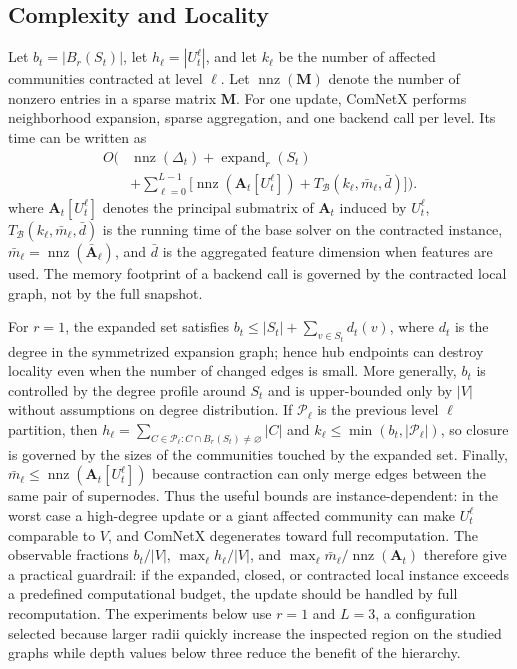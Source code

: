 \documentclass[conference]{IEEEtran}
\theoremstyle{definition}
\begin{document}
\subsection{Complexity and Locality}

Let $b_t=|B_r(S_t)|$, let $h_\ell=|U_t^\ell|$, and let
$k_\ell$ be the number of affected communities contracted at level $\ell$.
Let $\operatorname{nnz}(\mathbf{M})$ denote the number of nonzero entries in a
sparse matrix $\mathbf{M}$. For one update, ComNetX performs neighborhood
expansion, sparse aggregation, and one backend call per level. Its time can be
written as
\begin{equation*}
\begin{aligned}
O\!\Big(&\operatorname{nnz}(\Delta_t)+\operatorname{expand}_r(S_t)\\
&+\sum_{\ell=0}^{L-1}\big[
\operatorname{nnz}(\mathbf{A}_t[U_t^\ell])
+T_{\mathcal{B}}(k_\ell,\bar m_\ell,\bar d)\big]\Big).
\end{aligned}
\end{equation*}
where $\mathbf{A}_t[U_t^\ell]$ denotes the principal submatrix of
$\mathbf{A}_t$ induced by $U_t^\ell$,
$T_{\mathcal{B}}(k_\ell,\bar m_\ell,\bar d)$ is the running time of the base
solver on the contracted instance, $\bar m_\ell=\operatorname{nnz}(\bar{\mathbf{A}}_\ell)$,
and $\bar d$ is the aggregated feature dimension when features are used. The
memory footprint of a backend call is governed by the contracted local graph,
not by the full snapshot.

For $r=1$, the expanded set satisfies
$b_t \le |S_t|+\sum_{v\in S_t} d_t(v)$, where $d_t$ is the degree in the
symmetrized expansion graph; hence hub endpoints can destroy locality even
when the number of changed edges is small. More generally, $b_t$ is controlled
by the degree profile around $S_t$ and is upper-bounded only by $|V|$ without
assumptions on degree distribution. If $\mathcal{P}_\ell$ is the previous
level $\ell$ partition, then
$h_\ell=\sum_{C\in\mathcal{P}_\ell:C\cap B_r(S_t)\ne\varnothing}|C|$ and
$k_\ell\le\min(b_t,|\mathcal{P}_\ell|)$, so closure is governed by the sizes
of the communities touched by the expanded set. Finally,
$\bar m_\ell\le\operatorname{nnz}(\mathbf{A}_t[U_t^\ell])$ because contraction
can only merge edges between the same pair of supernodes. Thus the
useful bounds are instance-dependent: in the worst case a high-degree update or
a giant affected community can make $U_t^\ell$ comparable to $V$, and ComNetX
degenerates toward full recomputation. The observable fractions $b_t/|V|$,
$\max_\ell h_\ell/|V|$, and
$\max_\ell\bar m_\ell/\operatorname{nnz}(\mathbf{A}_t)$ therefore give a
practical guardrail: if the expanded, closed, or contracted local instance
exceeds a predefined computational budget, the update should be handled by full
recomputation. The experiments below use $r=1$ and $L=3$, a configuration
selected because larger radii quickly increase the inspected region on the
studied graphs while depth values below three reduce the benefit of the
hierarchy.
\end{document}
